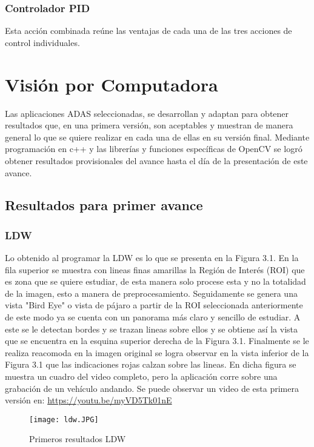 \subsubsection*{Controlador PID }

Esta acción combinada reúne las ventajas de cada una de las tres acciones de control individuales\cite{Mazzone2012}.
\newpage


\section{Visión por Computadora}

Las aplicaciones ADAS seleccionadas, se desarrollan y adaptan para obtener resultados que, en una primera versión, son aceptables y muestran de manera general lo que se quiere realizar en cada una de ellas en su versión final. Mediante programación en c++ y las librerías y funciones específicas de OpenCV se logró obtener resultados provisionales del avance hasta el día de la presentación de este avance.


\subsection{Resultados para primer avance}
\subsubsection{LDW}

Lo obtenido al programar la LDW es lo que se presenta en la Figura 3.1. En la fila superior se muestra con lineas finas amarillas la Región de Interés (ROI) que es zona que se quiere estudiar, de esta manera solo procese esta y no la totalidad de la imagen, esto a manera de preprocesamiento. Seguidamente se genera una vista "Bird Eye" o vista de pájaro a partir de la ROI seleccionada anteriormente de este modo ya se cuenta con un panorama más claro y sencillo de estudiar. A este se le detectan bordes y se trazan lineas sobre ellos y se obtiene así la vista que se encuentra en la esquina superior derecha de la Figura 3.1. Finalmente se le realiza reacomoda en la imagen original se logra observar en la vista inferior de la Figura 3.1 que las indicaciones rojas calzan sobre las lineas. En dicha figura se muestra un cuadro del video completo, pero la aplicación corre sobre una grabación de un vehículo andando. Se puede observar un video de esta primera versión en: \url{https://youtu.be/myVD5Tk01nE}

\begin{figure}[H]
  \centering
  \texttt{[image: ldw.JPG]}
  \caption{Primeros resultados LDW}
  \label{fig:boat2}
\end{figure}


